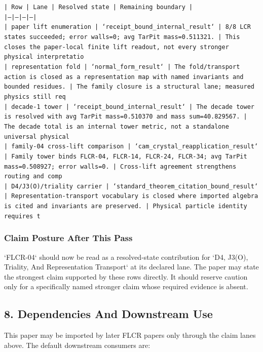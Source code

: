 \documentclass[11pt]{article}
\begin{document}
\noindent\texttt{| Row | Lane | Resolved state | Remaining boundary |}\\
\noindent\texttt{|---|---|---|---|}\\
\noindent\texttt{| paper lift enumeration | `receipt\_bound\_internal\_result` | 8/8 LCR states succeeded; error walls=0; avg TarPit mass=0.511321. | This closes the paper-local finite lift readout, not every stronger physical interpretatio}\\
\noindent\texttt{| representation fold | `normal\_form\_result` | The fold/transport action is closed as a representation map with named invariants and bounded residues. | The family closure is a structural lane; measured physics still req}\\
\noindent\texttt{| decade-1 tower | `receipt\_bound\_internal\_result` | The decade tower is resolved with avg TarPit mass=0.510370 and mass sum=40.829567. | The decade total is an internal tower metric, not a standalone universal physical }\\
\noindent\texttt{| family-04 cross-lift comparison | `cam\_crystal\_reapplication\_result` | Family tower binds FLCR-04, FLCR-14, FLCR-24, FLCR-34; avg TarPit mass=0.508927; error walls=0. | Cross-lift agreement strengthens routing and comp}\\
\noindent\texttt{| D4/J3(O)/triality carrier | `standard\_theorem\_citation\_bound\_result` | Representation-transport vocabulary is closed where imported algebra is cited and invariants are preserved. | Physical particle identity requires t}\\

\subsubsection*{Claim Posture After This Pass}

`FLCR-04` should now be read as a resolved-state contribution for `D4, J3(O), Triality, And Representation Transport` at its declared lane. The paper may state the strongest claim supported by these rows directly. It should reserve caution only for a specifically named stronger claim whose required evidence is absent.

\subsection*{8. Dependencies And Downstream Use}

This paper may be imported by later FLCR papers only through the claim lanes
above. The default downstream consumers are:
\end{document}
